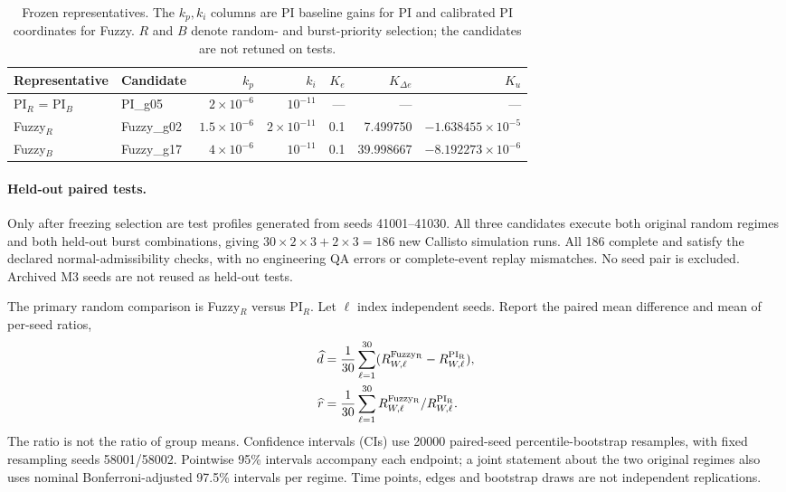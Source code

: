 \begin{table}[t]
\caption{Frozen representatives. The $k_p,k_i$ columns are PI baseline gains
for PI and calibrated PI coordinates for Fuzzy. $R$ and $B$ denote
random- and burst-priority selection; the candidates are not retuned on tests.}
\label{detail:tab:eval_selected_gains}
\centering
\begin{tabular}{@{}llrrrrr@{}}\toprule
Representative & Candidate & $k_p$ & $k_i$ & $K_e$ & $K_{\Delta e}$ & $K_u$\\\midrule
PI$_R$ = PI$_B$ & PI\_g05 & $2\times10^{-6}$ & $10^{-11}$ & --- & --- & ---\\
Fuzzy$_R$ & Fuzzy\_g02 & $1.5\times10^{-6}$ & $2\times10^{-11}$ & 0.1 & 7.499750 & $-1.638455\times10^{-5}$\\
Fuzzy$_B$ & Fuzzy\_g17 & $4\times10^{-6}$ & $10^{-11}$ & 0.1 & 39.998667 & $-8.192273\times10^{-6}$\\\bottomrule
\end{tabular}
\end{table}

\paragraph{Held-out paired tests.}
Only after freezing selection are test profiles generated from seeds
41001--41030. All three candidates execute both original random
regimes and both held-out burst combinations, giving
$30\times2\times3+2\times3=186$ new Callisto simulation runs. All 186 complete
and satisfy the declared normal-admissibility checks, with no
engineering QA errors or complete-event replay mismatches. No seed
pair is excluded. Archived M3 seeds are not reused as held-out tests.

The primary random comparison is Fuzzy$_R$ versus PI$_R$. Let $\ell$
index independent seeds. Report the paired mean difference and mean
of per-seed ratios,
\begin{align}
 \widehat d&=\frac1{30}\sum_{\ell=1}^{30}
       (R_{W,\ell}^{\rm Fuzzy_R}-R_{W,\ell}^{\rm PI_R}),\nonumber\\
 \widehat r&=\frac1{30}\sum_{\ell=1}^{30}
       R_{W,\ell}^{\rm Fuzzy_R}/R_{W,\ell}^{\rm PI_R}.
 \label{detail:eq:eval_paired_ratio}
\end{align}
The ratio is not the ratio of group means. Confidence intervals (CIs)
use 20000 paired-seed percentile-bootstrap resamples, with fixed
resampling seeds 58001/58002. Pointwise 95\% intervals accompany
each endpoint; a joint statement about the two original regimes also
uses nominal Bonferroni-adjusted 97.5\% intervals per regime.
Time points, edges and bootstrap draws are not independent replications.

